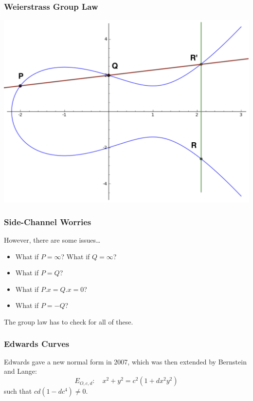 \documentclass[xcolor=dvipsnames, handout]{beamer}
\begin{document}
\begin{frame}
    \frametitle{Weierstrass Group Law}
    \includegraphics[scale=.5]{wgl.png}
\end{frame}

\begin{frame}
    \frametitle{Side-Channel Worries}
    However, there are some issues\dots
    \begin{itemize}
        \pause
        \item What if $P = \infty$? What if $Q = \infty$?
        \pause
        \item What if $P = Q$?
        \pause
        \item What if $P.x = Q.x = 0$?
        \pause
        \item What if $P = -Q$?
        \pause
    \end{itemize}
    \alert{The group law has to check for all of these.}
\end{frame}

\begin{frame}
    \frametitle{Edwards Curves}
    Edwards gave a new normal form in 2007, which was then extended by
        Bernstein and Lange:
    \begin{displaymath}
        E_{O, c, d}: \quad x^2 + y^2 = c^2(1 + dx^2y^2)
    \end{displaymath}
        such that $cd(1 - dc^4) \ne 0$.
\end{frame}
\end{document}

